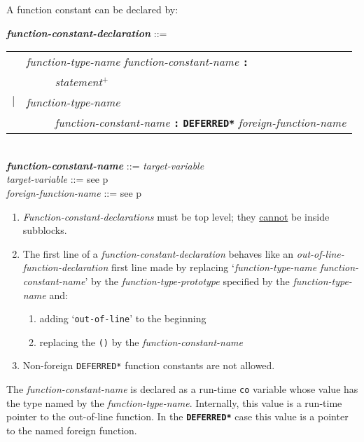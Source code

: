 \documentclass[12pt]{article}
\newcommand{\TT}[1]{{\tt \bfseries #1}}
\newcommand{\PLUS}[1][]{{$^{+#1}$}}
\newcommand{\emkey}[1]{{\em \bfseries #1}}
\newcommand{\pagref}[1]{p\pageref{#1}}
\newenvironment{indpar}[1][0.3in]%
	{\begin{list}{}%
		     {\setlength{\itemsep}{0in}%
		      \setlength{\topsep}{0in}%
		      \setlength{\parsep}{1ex}%
		      \setlength{\labelwidth}{#1}%
		      \setlength{\leftmargin}{#1}%
		      \addtolength{\leftmargin}{\labelsep}}%
	 \item}%
	{\end{list}}
\begin{document}
A function constant can be declared by:
\begin{indpar}
\emkey{function-constant-declaration}%
    \label{FUNCTION-CONSTANT-DECLARATION} ::= \\
\hspace*{0.5in}
    \begin{tabular}[t]{rl}
        &  {\em function-type-name} {\em function-constant-name} \TT{:} \\
	& \TT{~~~~~}{\em statement}\PLUS{} \\
    $|$ &  {\em function-type-name} \\
        &  \TT{~~~~~}{\em function-constant-name} \TT{:}
    	   \TT{*DEFERRED*} {\em foreign-function-name} \\
    \end{tabular}
\\[0.5ex]
\emkey{function-constant-name} ::= {\em target-variable}
\\[0.5ex]
{\em target-variable} ::= see \pagref{TARGET-VARIABLE}
\\[0.5ex]
{\em foreign-function-name} ::= see \pagref{FOREIGN-FUNCTION-NAME}
\begin{enumerate}
\item
{\em Function-constant-declarations} must be top level; they
\underline{cannot} be inside subblocks.
\item
The first line of a {\em function-constant-declaration}
behaves like an {\em out-of-line-func\-tion-declaration}
first line made by replacing
`{\em function-type-name} {\em function-con\-stant-name}'
by the {\em function-type-prototype} specified by the
{\em function-type-name} and:
\begin{enumerate}
\item adding `{\tt out-of-line}' to the beginning
\item
replacing the {\tt ()} by the {\em function-constant-name}
\end{enumerate}
\item Non-foreign {\tt *DEFERRED*} function constants are not allowed.
\end{enumerate}
\end{indpar}


The {\em function-constant-name} is declared as a run-time {\tt co}
variable whose
value has the type named by the {\em function-type-name}.
Internally, this value is a run-time pointer to the out-of-line function.
In the \TT{*DEFERRED*} case this value is a pointer to the named
foreign function.
\end{document}
